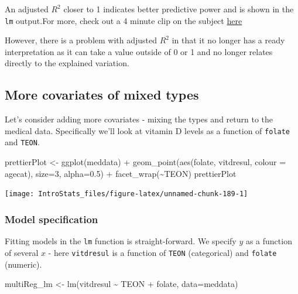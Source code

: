 \documentclass[
  oneside]{krantz}
\newenvironment{Shaded}{\begin{snugshade}}{\end{snugshade}}
\newcommand{\AttributeTok}[1]{\textcolor[rgb]{0.77,0.63,0.00}{#1}}
\newcommand{\DecValTok}[1]{\textcolor[rgb]{0.00,0.00,0.81}{#1}}
\newcommand{\FloatTok}[1]{\textcolor[rgb]{0.00,0.00,0.81}{#1}}
\newcommand{\FunctionTok}[1]{\textcolor[rgb]{0.00,0.00,0.00}{#1}}
\newcommand{\NormalTok}[1]{#1}
\newcommand{\OtherTok}[1]{\textcolor[rgb]{0.56,0.35,0.01}{#1}}
\newcommand{\SpecialCharTok}[1]{\textcolor[rgb]{0.00,0.00,0.00}{#1}}
\begin{document}
An adjusted \(R^2\) closer to 1 indicates better predictive power and is shown in the \texttt{lm} output.For more, check out a 4 minute clip on the subject \href{http://www.youtube.com/watch?v=8W2fGkU5LYU}{here}

However, there is a problem with adjusted \(R^2\) in that it no longer has a ready interpretation as it can take a value outside of 0 or 1 and no longer relates directly to the explained variation.

\hypertarget{more-covariates-of-mixed-types}{%
\subsection{More covariates of mixed types}\label{more-covariates-of-mixed-types}}

Let's consider adding more covariates - mixing the types and return to the medical data. Specifically we'll look at vitamin D levels as a function of \texttt{folate} and \texttt{TEON}.

\begin{Shaded}
\begin{Highlighting}[]
\NormalTok{prettierPlot }\OtherTok{\textless{}{-}} \FunctionTok{ggplot}\NormalTok{(meddata) }\SpecialCharTok{+} 
  \FunctionTok{geom\_point}\NormalTok{(}\FunctionTok{aes}\NormalTok{(folate, vitdresul, }\AttributeTok{colour =}\NormalTok{ agecat), }\AttributeTok{size=}\DecValTok{3}\NormalTok{, }\AttributeTok{alpha=}\FloatTok{0.5}\NormalTok{) }\SpecialCharTok{+} 
  \FunctionTok{facet\_wrap}\NormalTok{(}\SpecialCharTok{\textasciitilde{}}\NormalTok{TEON)}
\NormalTok{prettierPlot}
\end{Highlighting}
\end{Shaded}

\begin{center}\texttt{[image: IntroStats\_files/figure-latex/unnamed-chunk-189-1]} \end{center}

\hypertarget{model-specification-2}{%
\subsubsection{Model specification}\label{model-specification-2}}

Fitting models in the \texttt{lm} function is straight-forward. We specify \(y\) as a function of several \(x\) - here \texttt{vitdresul} is a function of \texttt{TEON} (categorical) and \texttt{folate} (numeric).

\begin{Shaded}
\begin{Highlighting}[]
\NormalTok{multiReg\_lm }\OtherTok{\textless{}{-}} \FunctionTok{lm}\NormalTok{(vitdresul }\SpecialCharTok{\textasciitilde{}}\NormalTok{ TEON }\SpecialCharTok{+}\NormalTok{ folate, }\AttributeTok{data=}\NormalTok{meddata)}
\end{Highlighting}
\end{Shaded}
\end{document}
